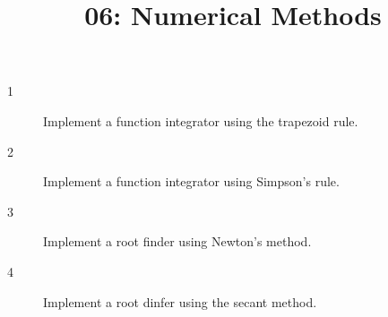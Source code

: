 \documentclass[10pt]{amsart}
\title{06: Numerical Methods}
\begin{document}
\maketitle

\begin{description}
\item[1] Implement a function integrator using the trapezoid rule.
\vspace{0.75in}

\item[2] Implement a function integrator using Simpson's rule.
\vspace{0.75in}

\item[3] Implement a root finder using Newton's method.
\vspace{0.75in}

\item[4] Implement a root dinfer using the secant method.
\end{description}
\end{document}
